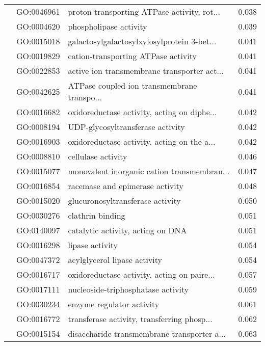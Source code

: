 \begin{longtable}{lllr}
   & GO:0046961 &  proton-transporting ATPase activity, rot... &         0.038 \\
   & GO:0004620 &                       phospholipase activity &         0.039 \\
   & GO:0015018 &  galactosylgalactosylxylosylprotein 3-bet... &         0.041 \\
   & GO:0019829 &          cation-transporting ATPase activity &         0.041 \\
   & GO:0022853 &  active ion transmembrane transporter act... &         0.041 \\
   & GO:0042625 &  ATPase coupled ion transmembrane transpo... &         0.041 \\
   & GO:0016682 &  oxidoreductase activity, acting on diphe... &         0.042 \\
   & GO:0008194 &             UDP-glycosyltransferase activity &         0.042 \\
   & GO:0016903 &  oxidoreductase activity, acting on the a... &         0.042 \\
   & GO:0008810 &                           cellulase activity &         0.046 \\
   & GO:0015077 &  monovalent inorganic cation transmembran... &         0.047 \\
   & GO:0016854 &              racemase and epimerase activity &         0.048 \\
   & GO:0015020 &             glucuronosyltransferase activity &         0.050 \\
   & GO:0030276 &                             clathrin binding &         0.051 \\
   & GO:0140097 &            catalytic activity, acting on DNA &         0.051 \\
   & GO:0016298 &                              lipase activity &         0.054 \\
   & GO:0047372 &                 acylglycerol lipase activity &         0.054 \\
   & GO:0016717 &  oxidoreductase activity, acting on paire... &         0.057 \\
   & GO:0017111 &           nucleoside-triphosphatase activity &         0.059 \\
   & GO:0030234 &                    enzyme regulator activity &         0.061 \\
   & GO:0016772 &  transferase activity, transferring phosp... &         0.062 \\
   & GO:0015154 &  disaccharide transmembrane transporter a... &         0.063 \\

\end{longtable}
